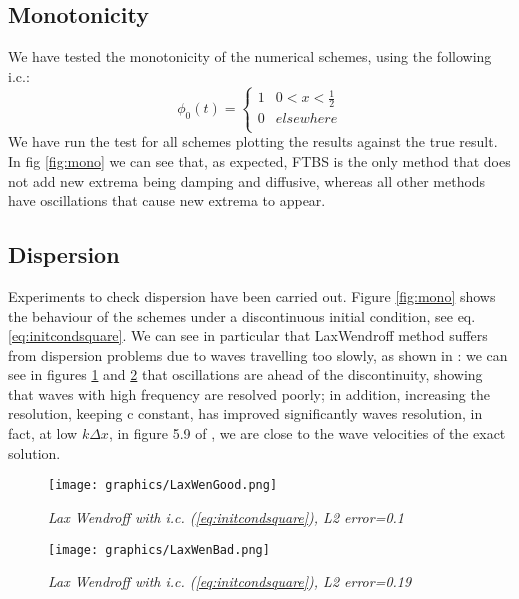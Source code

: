 \subsection{Monotonicity}
\label{sec:mono}
We have tested the monotonicity of the numerical schemes, using the following i.c.:
\begin{equation}
\phi_0(t)=\left\{
\begin{array}{lr}
1 & 0<x<\frac{1}{2} \\
0 &  elsewhere \\
\end{array}
\right.
\label{eq:initcondsquare}
\end{equation}
We have run the test for all schemes plotting the results against the true result. In fig \ref{fig:mono} we can see that, as expected, FTBS is the only method that does not add new extrema being damping and diffusive, whereas all other methods have oscillations that cause new extrema to appear.

\subsection{Dispersion}
Experiments to check dispersion have been carried out. Figure \ref{fig:mono} shows the behaviour of the schemes under a discontinuous initial condition, see eq. \ref{eq:initcondsquare}.
We can see in particular that LaxWendroff method suffers from dispersion problems due to waves travelling too slowly, as shown in \cite{mpebook}: we can see in figures \ref{fig:laxgood} and \ref{fig:laxbad} that oscillations are ahead of the discontinuity, showing that waves with high frequency are resolved poorly; in addition, increasing the resolution, keeping c constant, has improved significantly waves resolution, in fact, at low $k\Delta x$, in figure 5.9 of \cite{mpebook}, we are close to the wave velocities of the exact solution.

\begin{figure}[H]
	\begin{center}
		\texttt{[image: graphics/LaxWenGood.png]}
	\end{center}%
	\caption[LaxWen]{ \em Lax Wendroff with i.c. (\ref{eq:initcondsquare}), L2 error=0.1}
	\label{fig:laxgood}
\end{figure}

\begin{figure}[H]
	\begin{center}
		\texttt{[image: graphics/LaxWenBad.png]}
	\end{center}%
	\caption[LaxWen]{ \em Lax Wendroff with i.c. (\ref{eq:initcondsquare}), L2 error=0.19}
	\label{fig:laxbad}
\end{figure}

